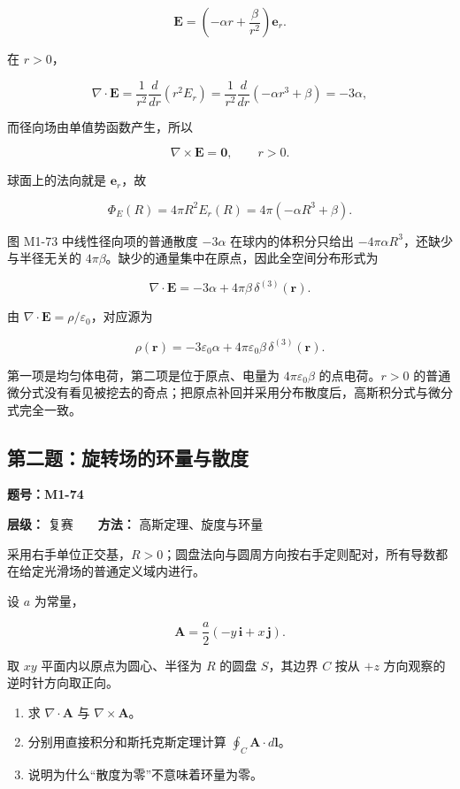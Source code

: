 \[
\boxed{
\mathbf E
=\left(-\alpha r+\frac{\beta}{r^2}\right)\mathbf e_r
}.
\]

在 \(r>0\)，

\[
\nabla\cdot\mathbf E
=\frac1{r^2}\frac{d}{dr}\left(r^2E_r\right)
=\frac1{r^2}\frac{d}{dr}\left(-\alpha r^3+\beta\right)
=-3\alpha,
\]

而径向场由单值势函数产生，所以

\[
\nabla\times\mathbf E=\mathbf0,
\qquad r>0.
\]

球面上的法向就是 \(\mathbf e_r\)，故

\[
\Phi_E(R)
=4\pi R^2E_r(R)
=4\pi\left(-\alpha R^3+\beta\right).
\]

图 M1-73 中线性径向项的普通散度 \(-3\alpha\) 在球内的体积分只给出
\(-4\pi\alpha R^3\)，还缺少与半径无关的
\(4\pi\beta\)。缺少的通量集中在原点，因此全空间分布形式为

\[
\boxed{
\nabla\cdot\mathbf E
=-3\alpha+4\pi\beta\,\delta^{(3)}(\mathbf r)
}.
\]

由 \(\nabla\cdot\mathbf E=\rho/\varepsilon_0\)，对应源为

\[
\boxed{
\rho(\mathbf r)
=-3\varepsilon_0\alpha
+4\pi\varepsilon_0\beta\,\delta^{(3)}(\mathbf r)
}.
\]

第一项是均匀体电荷，第二项是位于原点、电量为 \(4\pi\varepsilon_0\beta\)
的点电荷。\(r>0\)
的普通微分式没有看见被挖去的奇点；把原点补回并采用分布散度后，高斯积分式与微分式完全一致。

\par{}
\noindent\begin{minipage}{\linewidth}

\subsection{第二题：旋转场的环量与散度}\label{m1:ux7b2cux4e8cux9898ux65cbux8f6cux573aux7684ux73afux91cfux4e0eux6563ux5ea6}

\textbf{题号：M1-74}

\textbf{层级：} 复赛　　\textbf{方法：} 高斯定理、旋度与环量

采用右手单位正交基，\(R>0\)；圆盘法向与圆周方向按右手定则配对，所有导数都在给定光滑场的普通定义域内进行。

设 \(a\) 为常量，

\[
\mathbf A=\frac a2(-y\,\mathbf i+x\,\mathbf j).
\]

取 \(xy\) 平面内以原点为圆心、半径为 \(R\) 的圆盘 \(S\)，其边界 \(C\)
按从 \(+z\) 方向观察的逆时针方向取正向。

\begin{enumerate}
\def\labelenumi{\arabic{enumi}.}
\tightlist
\item
  求 \(\nabla\cdot\mathbf A\) 与 \(\nabla\times\mathbf A\)。
\item
  分别用直接积分和斯托克斯定理计算
  \(\oint_C\mathbf A\cdot d\mathbf l\)。
\item
  说明为什么``散度为零''不意味着环量为零。
\end{enumerate}


\end{minipage}\par

